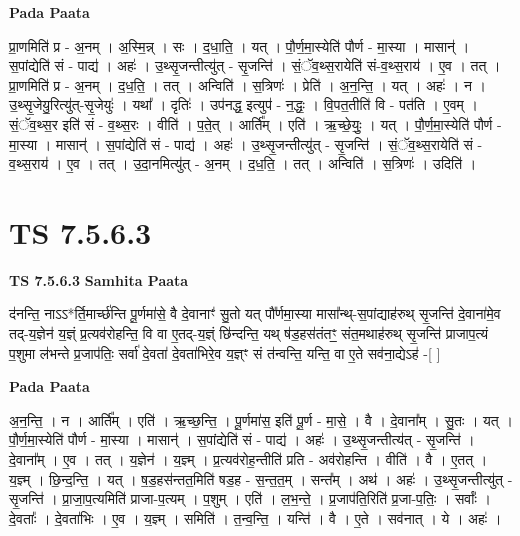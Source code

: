 \documentclass[17pt]{extarticle}
\begin{document}
\textbf{Pada Paata} \newline

प्रा॒णमिति॑ प्र - अ॒नम् । अ॒स्मि॒न्न् । सः । द॒धा॒ति॒ । यत् । पौ॒र्ण॒मा॒स्येति॑ पौर्ण - मा॒स्या । मासान्॑ । स॒पांद्येति॑ सं - पाद्य॑ । अहः॑ । उ॒थ्सृ॒जन्तीत्यु॑त् - सृ॒जन्ति॑ । सं॒ॅव॒थ्स॒रायेति॑ सं-व॒थ्स॒राय॑ । ए॒व । तत् । प्रा॒णमिति॑ प्र - अ॒नम् । द॒ध॒ति॒ । तत् । अन्विति॑ । स॒त्रिणः॑ । प्रेति॑ । अ॒न॒न्ति॒ । यत् । अहः॑ । न । उ॒थ्सृ॒जेयु॒रित्यु॑त्-सृ॒जेयुः॑ । यथा᳚ । दृतिः॑ । उप॑नद्ध॒ इत्युप॑ - न॒द्धः॒ । वि॒पत॒तीति॑ वि - पत॑ति । ए॒वम् । सं॒ॅव॒थ्स॒र इति॑ सं - व॒थ्स॒रः । वीति॑ । प॒ते॒त् । आर्ति᳚म् । एति॑ । ऋ॒च्छे॒युः॒ । यत् । पौ॒र्ण॒मा॒स्येति॑ पौर्ण - मा॒स्या । मासान्॑ । स॒पांद्येति॑ सं - पाद्य॑ । अहः॑ । उ॒थ्सृ॒जन्तीत्यु॑त् - सृ॒जन्ति॑ । सं॒ॅव॒थ्स॒रायेति॑ सं - व॒थ्स॒राय॑ । ए॒व । तत् । उ॒दा॒नमित्यु॑त् - अ॒नम् । द॒ध॒ति॒ । तत् । अन्विति॑ । स॒त्रिणः॑ । उदिति॑ ।  \newline





\section{ TS 7.5.6.3 }

\textbf{TS 7.5.6.3 } \newline
\textbf{Samhita Paata} \newline

द॑नन्ति॒ नाऽऽ*र्ति॒मार्च्छ॑न्ति पू॒र्णमा॑से॒ वै दे॒वानाꣳ॑ सु॒तो यत् पौ᳚र्णमा॒स्या मासा᳚न्थ्-स॒पांद्याह॑रुथ् सृ॒जन्ति॑ दे॒वाना॑मे॒व तद्-य॒ज्ञेन॑ य॒ज्ञ्ं प्र॒त्यव॑रोहन्ति॒ वि वा ए॒तद्-य॒ज्ञ्ं छि॑न्दन्ति॒ यथ् ष॑ड॒हस॑तंतꣳ॒॒ संत॒मथाह॑रुथ् सृ॒जन्ति॑ प्राजाप॒त्यं प॒शुमा ल॑भन्ते प्र॒जाप॑तिः॒ सर्वा॑ दे॒वता॑ दे॒वता॑भिरे॒व य॒ज्ञ्ꣳ सं त॑न्वन्ति॒ यन्ति॒ वा ए॒ते सव॑ना॒द्येऽह॑ -[  ] \newline

\textbf{Pada Paata} \newline

अ॒न॒न्ति॒ । न । आर्ति᳚म् । एति॑ । ऋ॒च्छ॒न्ति॒ । पू॒र्णमा॑स॒ इति॑ पू॒र्ण - मा॒से॒ । वै । दे॒वाना᳚म् । सु॒तः । यत् । पौ॒र्ण॒मा॒स्येति॑ पौर्ण - मा॒स्या । मासान्॑ । स॒पांद्येति॑ सं - पाद्य॑ । अहः॑ । उ॒थ्सृ॒जन्तीत्य॑त् - सृ॒जन्ति॑ । दे॒वाना᳚म् । ए॒व । तत् । य॒ज्ञेन॑ । य॒ज्ञ्म् । प्र॒त्यव॑रोह॒न्तीति॑ प्रति - अव॑रोहन्ति । वीति॑ । वै । ए॒तत् । य॒ज्ञ्म् । छि॒न्द॒न्ति॒ । यत् । ष॒ड॒हस॑न्तत॒मिति॑ षड॒ह - स॒न्त॒त॒म् । सन्त᳚म् । अथ॑ । अहः॑ । उ॒थ्सृ॒जन्तीत्यु॑त् - सृ॒जन्ति॑ । प्रा॒जा॒प॒त्यमिति॑ प्राजा-प॒त्यम् । प॒शुम् । एति॑ । ल॒भ॒न्ते॒ । प्र॒जाप॑ति॒रिति॑ प्र॒जा-प॒तिः॒ । सर्वाः᳚ । दे॒वताः᳚ । दे॒वता॑भिः । ए॒व । य॒ज्ञ्म् । समिति॑ । त॒न्व॒न्ति॒ । यन्ति॑ । वै । ए॒ते । सव॑नात् । ये । अहः॑ ।  \newline
\end{document}
